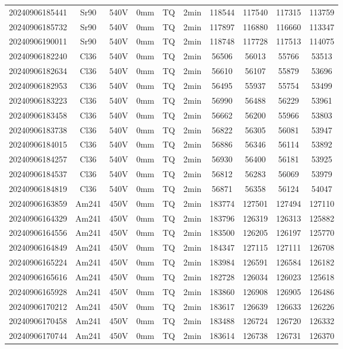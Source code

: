 \begin{center}
{\begin{longtable}{c c c c c c c c c c}
    20240906185441 & Sr90 & 540V & 0mm & TQ & 2min & 118544 & 117540 & 117315 & 113759 \\
    20240906185732 & Sr90 & 540V & 0mm & TQ & 2min & 117897 & 116880 & 116660 & 113347 \\
    20240906190011 & Sr90 & 540V & 0mm & TQ & 2min & 118748 & 117728 & 117513 & 114075 \\
    \midrule
    20240906182240 & Cl36 & 540V & 0mm & TQ & 2min & 56506 & 56013 & 55766 & 53513 \\ 
    20240906182634 & Cl36 & 540V & 0mm & TQ & 2min & 56610 & 56107 & 55879 & 53696 \\
    20240906182953 & Cl36 & 540V & 0mm & TQ & 2min & 56495 & 55937 & 55754 & 53499 \\
    20240906183223 & Cl36 & 540V & 0mm & TQ & 2min & 56990 & 56488 & 56229 & 53961 \\
    20240906183458 & Cl36 & 540V & 0mm & TQ & 2min & 56662 & 56200 & 55966 & 53803 \\
    20240906183738 & Cl36 & 540V & 0mm & TQ & 2min & 56822 & 56305 & 56081 & 53947 \\
    20240906184015 & Cl36 & 540V & 0mm & TQ & 2min & 56886 & 56346 & 56114 & 53892 \\ 
    20240906184257 & Cl36 & 540V & 0mm & TQ & 2min & 56930 & 56400 & 56181 & 53925 \\
    20240906184537 & Cl36 & 540V & 0mm & TQ & 2min & 56812 & 56283 & 56069 & 53979 \\
    20240906184819 & Cl36 & 540V & 0mm & TQ & 2min & 56871 & 56358 & 56124 & 54047 \\
    \midrule
    20240906163859 & Am241 & 450V & 0mm & TQ & 2min & 183774 & 127501 & 127494 & 127110 \\ 
    20240906164329 & Am241 & 450V & 0mm & TQ & 2min & 183796 & 126319 & 126313 & 125882 \\
    20240906164556 & Am241 & 450V & 0mm & TQ & 2min & 183500 & 126205 & 126197 & 125770 \\
    20240906164849 & Am241 & 450V & 0mm & TQ & 2min & 184347 & 127115 & 127111 & 126708 \\
    20240906165224 & Am241 & 450V & 0mm & TQ & 2min & 183984 & 126591 & 126584 & 126182 \\
    20240906165616 & Am241 & 450V & 0mm & TQ & 2min & 182728 & 126034 & 126023 & 125618 \\
    20240906165928 & Am241 & 450V & 0mm & TQ & 2min & 183860 & 126908 & 126905 & 126486 \\ 
    20240906170212 & Am241 & 450V & 0mm & TQ & 2min & 183617 & 126639 & 126633 & 126226 \\
    20240906170458 & Am241 & 450V & 0mm & TQ & 2min & 183488 & 126724 & 126720 & 126332 \\
    20240906170744 & Am241 & 450V & 0mm & TQ & 2min & 183614 & 126738 & 126731 & 126370 \\

\end{longtable}
}
\end{center}

